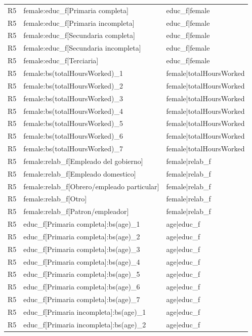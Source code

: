 \begin{longtable}{lll}
R5 & female:educ\_f[Primaria completa] & educ\_f|female \\
R5 & female:educ\_f[Primaria incompleta] & educ\_f|female \\
R5 & female:educ\_f[Secundaria completa] & educ\_f|female \\
R5 & female:educ\_f[Secundaria incompleta] & educ\_f|female \\
R5 & female:educ\_f[Terciaria] & educ\_f|female \\
R5 & female:bs(totalHoursWorked)\_1 & female|totalHoursWorked \\
R5 & female:bs(totalHoursWorked)\_2 & female|totalHoursWorked \\
R5 & female:bs(totalHoursWorked)\_3 & female|totalHoursWorked \\
R5 & female:bs(totalHoursWorked)\_4 & female|totalHoursWorked \\
R5 & female:bs(totalHoursWorked)\_5 & female|totalHoursWorked \\
R5 & female:bs(totalHoursWorked)\_6 & female|totalHoursWorked \\
R5 & female:bs(totalHoursWorked)\_7 & female|totalHoursWorked \\
R5 & female:relab\_f[Empleado del gobierno] & female|relab\_f \\
R5 & female:relab\_f[Empleado domestico] & female|relab\_f \\
R5 & female:relab\_f[Obrero/empleado particular] & female|relab\_f \\
R5 & female:relab\_f[Otro] & female|relab\_f \\
R5 & female:relab\_f[Patron/empleador] & female|relab\_f \\
R5 & educ\_f[Primaria completa]:bs(age)\_1 & age|educ\_f \\
R5 & educ\_f[Primaria completa]:bs(age)\_2 & age|educ\_f \\
R5 & educ\_f[Primaria completa]:bs(age)\_3 & age|educ\_f \\
R5 & educ\_f[Primaria completa]:bs(age)\_4 & age|educ\_f \\
R5 & educ\_f[Primaria completa]:bs(age)\_5 & age|educ\_f \\
R5 & educ\_f[Primaria completa]:bs(age)\_6 & age|educ\_f \\
R5 & educ\_f[Primaria completa]:bs(age)\_7 & age|educ\_f \\
R5 & educ\_f[Primaria incompleta]:bs(age)\_1 & age|educ\_f \\
R5 & educ\_f[Primaria incompleta]:bs(age)\_2 & age|educ\_f \\

\end{longtable}

